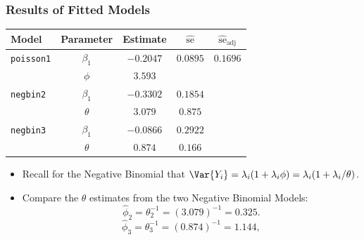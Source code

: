 \documentclass[oneside]{book}\usepackage[]{graphicx}\usepackage[svgnames]{xcolor}
\begin{document}
\subsubsection*{Results of Fitted Models}
\begin{table}[H]
      \centering
      \begin{tabular}{lcccc}
            Model             & Parameter   & Estimate    & $ \widehat{\text{se}} $ & $ \widehat{\text{se}}_{\text{adj}} $ \\
            \midrule
            \texttt{poisson1} & $ \beta_1 $ & $ -0.2047 $ & $ 0.0895 $              & $0.1696$                             \\
                              & $ \phi $    & $3.593$                                                                      \\
            \texttt{negbin2}  & $ \beta_1 $ & $ -0.3302 $ & $ 0.1854 $                                                     \\
                              & $ \theta $  & $3.079$     & $0.875$                                                        \\
            \texttt{negbin3}  & $ \beta_1 $ & $ -0.0866 $ & $ 0.2922 $                                                     \\
                              & $ \theta $  & $0.874$     & $0.166$                                                        \\
            \bottomrule
      \end{tabular}
\end{table}
\begin{itemize}
      \item Recall for the Negative Binomial that $ \Var{Y_i}=\lambda_i(1+\lambda_i\phi)=\lambda_i(1+\lambda_i/\theta) $.
      \item Compare the $ \theta $ estimates from the two Negative Binomial Models:
            \[ \hat{\phi}_2=\theta_2^{-1}=(3.079)^{-1}=0.325. \]
            \[ \hat{\phi}_3=\theta_3^{-1}=(0.874)^{-1}=1.144, \]
\end{itemize}
\end{document}
